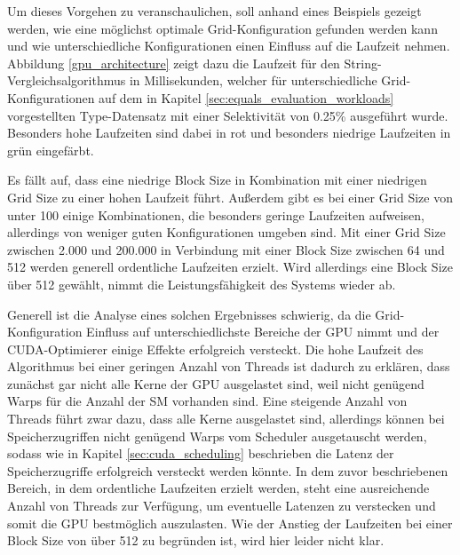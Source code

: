 Um dieses Vorgehen zu veranschaulichen, soll anhand eines Beispiels gezeigt werden, wie eine möglichst optimale Grid-Konfiguration gefunden werden kann und wie unterschiedliche Konfigurationen einen Einfluss auf die Laufzeit nehmen.
Abbildung \ref{gpu_architecture} zeigt dazu die Laufzeit für den String-Vergleichsalgorithmus in Millisekunden, welcher für unterschiedliche Grid-Konfigurationen auf dem in Kapitel \ref{sec:equals_evaluation_workloads} vorgestellten Type-Datensatz mit einer Selektivität von 0.25\% ausgeführt wurde.
Besonders hohe Laufzeiten sind dabei in rot und besonders niedrige Laufzeiten in grün eingefärbt.

Es fällt auf, dass eine niedrige Block Size in Kombination mit einer niedrigen Grid Size zu einer hohen Laufzeit führt.
Außerdem gibt es bei einer Grid Size von unter 100 einige Kombinationen, die besonders geringe Laufzeiten aufweisen, allerdings von weniger guten Konfigurationen umgeben sind.
Mit einer Grid Size zwischen 2.000 und 200.000 in Verbindung mit einer Block Size zwischen 64 und 512 werden generell ordentliche Laufzeiten erzielt.
Wird allerdings eine Block Size über 512 gewählt, nimmt die Leistungsfähigkeit des Systems wieder ab.

Generell ist die Analyse eines solchen Ergebnisses schwierig, da die Grid-Konfiguration Einfluss auf unterschiedlichste Bereiche der GPU nimmt und der CUDA-Optimierer einige Effekte erfolgreich versteckt.
Die hohe Laufzeit des Algorithmus bei einer geringen Anzahl von Threads ist dadurch zu erklären, dass zunächst gar nicht alle Kerne der GPU ausgelastet sind, weil nicht genügend Warps für die Anzahl der SM vorhanden sind.
Eine steigende Anzahl von Threads führt zwar dazu, dass alle Kerne ausgelastet sind, allerdings können bei Speicherzugriffen nicht genügend Warps vom Scheduler ausgetauscht werden, sodass wie in Kapitel \ref{sec:cuda_scheduling} beschrieben die Latenz der Speicherzugriffe erfolgreich versteckt werden könnte.
In dem zuvor beschriebenen Bereich, in dem ordentliche Laufzeiten erzielt werden, steht eine ausreichende Anzahl von Threads zur Verfügung, um eventuelle Latenzen zu verstecken und somit die GPU bestmöglich auszulasten.
Wie der Anstieg der Laufzeiten bei einer Block Size von über 512 zu begründen ist, wird hier leider nicht klar.

